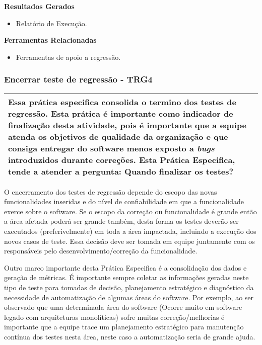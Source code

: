 \textbf{Resultados Gerados}
\begin{itemize}
    \item Relatório de Execução.
\end{itemize}

\textbf{Ferramentas Relacionadas}
\begin{itemize}
    \item Ferramentas de apoio a regressão.
\end{itemize}

\subsubsection{Encerrar teste de regressão - TRG4}
\label{sec:trg4}

\begin{table}[H]
\centering
\begin{tabular}{|p{130mm}|}
\hline
Essa prática especifica consolida o termino dos testes de regressão. Esta prática é importante como indicador de finalização desta atividade, pois é importante que a equipe atenda os objetivos de qualidade da organização e que consiga entregar do software menos exposto a \textit{bugs} introduzidos durante correções. Esta Prática Especifica, tende a atender a pergunta: Quando finalizar os testes?\\
\hline
\end{tabular}
\end{table}

O encerramento dos testes de regressão depende do escopo das novas funcionalidades inseridas e do nível de confiabilidade em que a funcionalidade exerce sobre o software. Se o escopo da correção ou funcionalidade é grande então a área afetada poderá ser grande também, desta forma os testes deverão ser executados (preferivelmente) em toda a área impactada, incluindo a execução dos novos casos de teste. Essa decisão deve ser tomada em equipe juntamente com os responsáveis pelo desenvolvimento/correção da funcionalidade.

Outro marco importante desta Prática Especifica é a consolidação dos dados e geração de métricas. É importante sempre coletar as informações geradas neste tipo de teste para tomadas de decisão, planejamento estratégico e diagnóstico da necessidade de automatização de algumas áreas do software. Por exemplo, ao ser observado que uma determinada área do software (Ocorre muito em software legado com arquiteturas monolíticas) sofre muitas correção/melhorias é importante que a equipe trace um planejamento estratégico para manutenção contínua dos testes nesta área, neste caso a automatização seria de grande ajuda.


